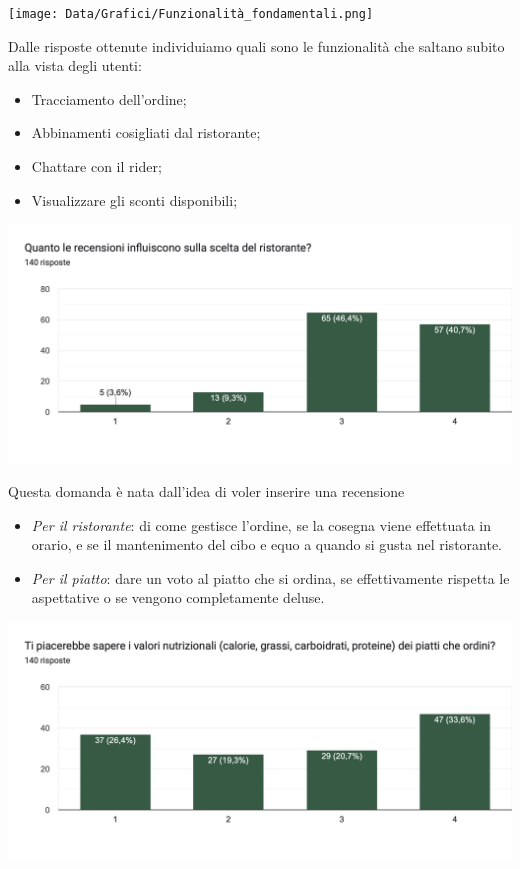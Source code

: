 \documentclass{article}
\begin{document}
\texttt{[image: Data/Grafici/Funzionalità\_fondamentali.png]}\par
Dalle risposte ottenute individuiamo quali sono le funzionalità che saltano subito alla vista degli utenti:
\par \begin{itemize}
    \item Tracciamento dell'ordine;
    \item Abbinamenti cosigliati dal ristorante;
    \item Chattare con il rider;
    \item Visualizzare gli sconti disponibili;
\end{itemize}   \vspace{1cm} \par
\includegraphics[width=\textwidth]{Data/Grafici/recensioni_influiscono.png}\par
Questa domanda è nata dall'idea di voler inserire una recensione 
    \begin{itemize}
        \item \textit{Per il ristorante}: di come gestisce l'ordine, se la cosegna viene effettuata in orario, e se il mantenimento del cibo e equo a quando si gusta nel ristorante.
        \item \textit{Per il piatto}: dare un voto al piatto che si ordina, se effettivamente rispetta le aspettative o se vengono completamente deluse.
    \end{itemize}
    \par \vspace{1cm}
\includegraphics[width=\textwidth]{Data/Grafici/Valori_nutrizionali.png}\par
\end{document}

